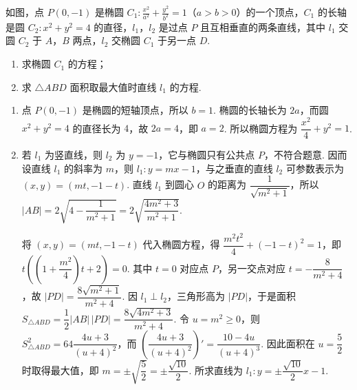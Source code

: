 \begin{problem}
如图，点 \(P(0, -1)\) 是椭圆 \(C_1: \frac{x^2}{a^2} + \frac{y^2}{b^2} = 1\)（\(a > b > 0\)）的一个顶点，\(C_1\) 的长轴是圆 \(C_2: x^2 + y^2 = 4\) 的直径，\(l_1\)，\(l_2\) 是过点 \(P\) 且互相垂直的两条直线，其中 \(l_1\) 交圆 \(C_2\) 于 \(A\)，\(B\) 两点，\(l_2\) 交椭圆 \(C_1\) 于另一点 \(D\).

\vspace{-0.5em}

\begin{enumerate}
\item 求椭圆 \(C_1\) 的方程；
\item 求 \(\triangle ABD\) 面积取最大值时直线 \(l_1\) 的方程.
\end{enumerate}

\end{problem}

\begin{solution}
\begin{enumerate}
\item 点 \(P(0,-1)\) 是椭圆的短轴顶点，所以 \(b=1\). 椭圆的长轴长为 \(2a\)，而圆 \(x^{2}+y^{2}=4\) 的直径长为 \(4\)，故 \(2a=4\)，即 \(a=2\). 所以椭圆方程为 \(\dfrac{x^{2}}{4}+y^{2}=1\).

\item 若 \(l_{1}\) 为竖直线，则 \(l_{2}\) 为 \(y=-1\)，它与椭圆只有公共点 \(P\)，不符合题意. 因而设直线 \(l_{1}\) 的斜率为 \(m\)，则 \(l_{1}:y=mx-1\)，与之垂直的直线 \(l_{2}\) 可参数表示为 \((x,y)=(mt,-1-t)\). 直线 \(l_{1}\) 到圆心 \(O\) 的距离为 \(\dfrac{1}{\sqrt{m^{2}+1}}\)，所以
\(|AB|=2\sqrt{4-\dfrac{1}{m^{2}+1}}=2\sqrt{\dfrac{4m^{2}+3}{m^{2}+1}}\).

将 \((x,y)=(mt,-1-t)\) 代入椭圆方程，得 \(\dfrac{m^{2}t^{2}}{4}+(-1-t)^{2}=1\)，即 \(t\left(\left(1+\dfrac{m^{2}}{4}\right)t+2\right)=0\). 其中 \(t=0\) 对应点 \(P\)，另一交点对应 \(t=-\dfrac{8}{m^{2}+4}\)，故 \(|PD|=\dfrac{8\sqrt{m^{2}+1}}{m^{2}+4}\). 因 \(l_{1}\perp l_{2}\)，三角形高为 \(|PD|\)，于是面积
\(S_{\triangle ABD}=\dfrac12|AB|\,|PD|=\dfrac{8\sqrt{4m^{2}+3}}{m^{2}+4}\). 令 \(u=m^{2}\geqslant0\)，则
\(S_{\triangle ABD}^{2}=64\dfrac{4u+3}{(u+4)^{2}}\)，而 \(\left(\dfrac{4u+3}{(u+4)^{2}}\right)'=\dfrac{10-4u}{(u+4)^{3}}\). 因此面积在 \(u=\dfrac52\) 时取得最大值，即 \(m=\pm\sqrt{\dfrac52}=\pm\dfrac{\sqrt{10}}{2}\). 所求直线为 \(l_{1}:y=\pm\dfrac{\sqrt{10}}{2}x-1\).
\end{enumerate}
\end{solution}

